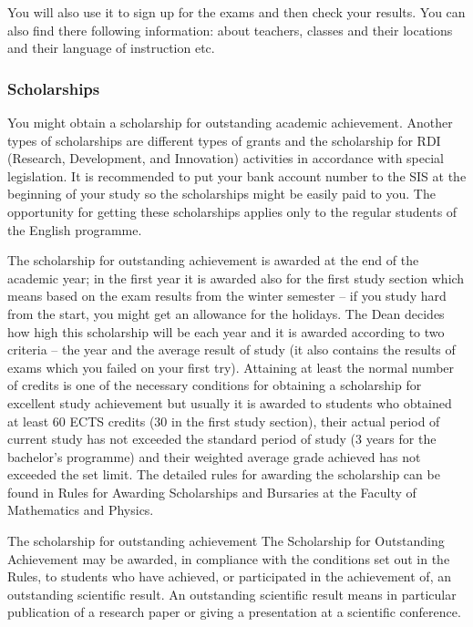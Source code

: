 You will also use it to sign up for the exams and then check your results. You
can also find there following information: about teachers, classes and their
locations and their language of instruction etc.


\subsubsection{Scholarships}
You might obtain a scholarship for outstanding academic achievement. Another
types of scholarships are different types of grants and the scholarship for RDI
(Research, Development, and Innovation) activities in accordance with special
legislation.
It is recommended to put your bank account number to the SIS at the beginning of
your study so the scholarships might be easily paid to you. The opportunity for
getting these scholarships applies only to the regular students of the English
programme.

The scholarship for outstanding achievement is awarded at the end of the
academic year; in the first year it is awarded also for the first study section
which means based on the exam results from the winter semester -- if you
study hard from the start, you might get an allowance for the holidays.
The Dean decides how high this scholarship will be each year and it is awarded
according to two criteria -- the year and the average result of study (it also
contains the results of exams which you failed on your first try).
Attaining at least the normal number of credits is one of the necessary
conditions for obtaining a scholarship for excellent study achievement but
usually it is awarded to students who obtained at least 60 ECTS credits (30 in
the first study section), their actual period of current study has not exceeded
the standard period of study (3 years for the bachelor's programme) and their
weighted average grade achieved has not exceeded the set limit.
The detailed rules for awarding the scholarship can be found in Rules for
Awarding Scholarships and Bursaries at the Faculty of Mathematics and Physics.

The scholarship for outstanding achievement
The Scholarship for Outstanding Achievement may be awarded, in compliance with
the conditions set out in the Rules, to students who have achieved, or
participated in the achievement of, an outstanding scientific result. An
outstanding scientific result means in particular publication of a research
paper or giving a presentation at a scientific conference.

